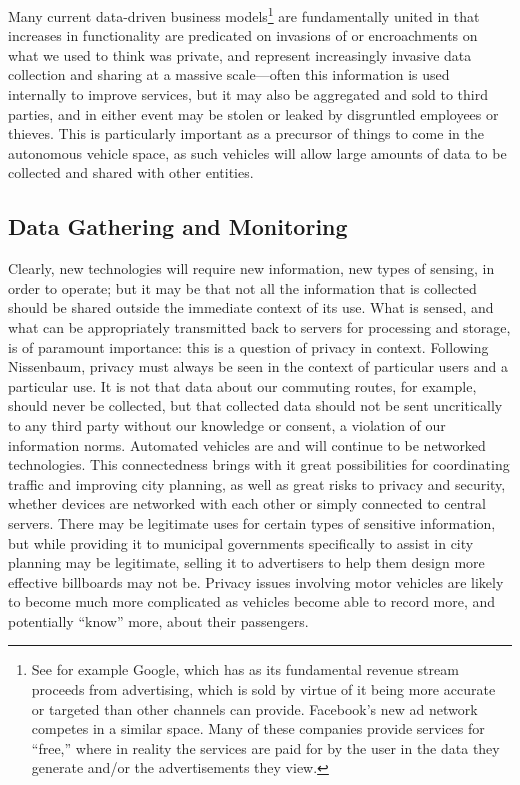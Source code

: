 Many current data-driven business models\footnote{See for example
  Google, which has as its fundamental revenue stream proceeds from
  advertising, which is sold by virtue of it being more accurate or
  targeted than other channels can provide. Facebook's new ad network
  competes in a similar space. Many of these companies provide
  services for ``free,'' where in reality the services are paid for by
the user in the data they generate and/or the advertisements they
view.} are fundamentally united in that increases in
functionality are predicated on invasions of or encroachments on what
we used to think was private, and represent increasingly invasive data
collection and sharing at a massive scale---often this information is
used internally to improve services, but it may also be aggregated and
sold to third parties, and in either event may be stolen or leaked by
disgruntled employees or thieves. This
is particularly important as a precursor of things to
come in the autonomous vehicle space, as such vehicles will allow
large amounts of data to be collected and shared with other entities. 


\subsection{Data Gathering and Monitoring} 

Clearly, new technologies will require new information, new types of
sensing, in order to operate; but it may be that not all the
information that is collected should be shared outside the immediate
context of its use. What is sensed, and what can be appropriately
transmitted back to servers for processing and storage, is of
paramount importance: this is a question of privacy in context.\cite{???}
Following Nissenbaum, privacy must always be seen in the context of
particular users and a particular use.\cite{???} It is not that data about our
commuting routes, for example, should never be collected, but that collected data
should not be sent uncritically to any third party without our
knowledge or consent, a violation of our information norms.\cite{???} 
Automated vehicles are and will continue to be networked
technologies. This connectedness brings with it great possibilities
for coordinating traffic and improving city planning, as well as great
risks to privacy and security, whether devices are networked with each
other or simply connected to central servers. There
may be legitimate uses for certain types of sensitive information, but
while providing it to municipal governments specifically to assist in
city planning may be legitimate, selling it to advertisers to help
them design more effective billboards may not be. Privacy issues
involving motor vehicles are likely to become much more complicated as
vehicles become able to record more, and potentially “know” more,
about their passengers.


